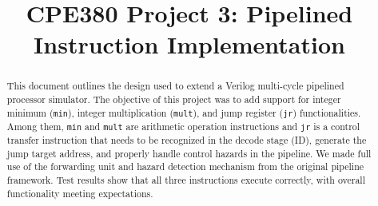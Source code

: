 \documentclass[conference]{IEEEtran}
\begin{document}
\title{CPE380 Project 3: Pipelined Instruction Implementation}

\author{
\and
{}
\and
{}
}

\maketitle

\begin{abstract}
    
    This document outlines the design used to extend a Verilog multi-cycle
    pipelined processor simulator. The objective of this project was to add
    support for integer minimum (\texttt{min}), integer multiplication (\texttt{mult}), and jump register (\texttt{jr}) functionalities. Among them, \texttt{min} and \texttt{mult} are arithmetic operation instructions and \texttt{jr} is a control transfer instruction that needs to be recognized in the decode stage (ID), generate the jump target address, and properly handle control hazards in the pipeline. We made full use of the forwarding unit and hazard detection mechanism from the original pipeline framework. Test results show that all three instructions execute correctly, with overall functionality meeting expectations.


\end{abstract}

\begin{IEEEkeywords}
    
\end{IEEEkeywords}
\end{document}
